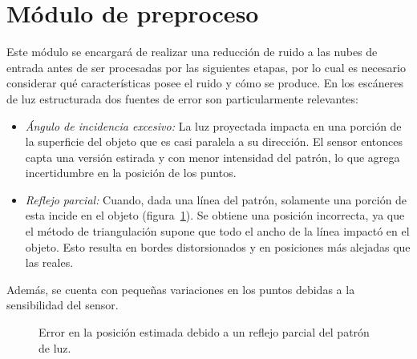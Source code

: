 \section{Módulo de preproceso}
Este módulo se encargará de realizar una reducción de ruido a las nubes de entrada
antes de ser procesadas por las siguientes etapas,
por lo cual es necesario considerar
qué características posee el ruido y cómo se produce.
En los escáneres de luz estructurada dos fuentes de error son particularmente relevantes:
\begin{itemize}
	\item \emph{Ángulo de incidencia excesivo:\/}
		La luz proyectada impacta en una porción de la superficie del objeto
		que es casi paralela a su dirección.
		El sensor entonces capta una versión estirada y con menor intensidad del patrón, lo que 
		agrega incertidumbre en la posición de los puntos.
	\item \emph{Reflejo parcial:\/}
		Cuando, dada una línea del patrón, solamente una porción de esta incide en el objeto (figura~\ref{fig:error_adquisicion}).
		Se obtiene una posición incorrecta, ya que el método de triangulación
		supone que todo el ancho de la línea impactó en el objeto.
		Esto resulta en bordes distorsionados y en posiciones más alejadas que las reales.\cite{Turk:1994:ZPM:192161.192241}
\end{itemize}
Además, se cuenta con pequeñas variaciones en los puntos debidas a la sensibilidad del sensor.

\begin{figure}
	\caption{\label{fig:error_adquisicion}Error en la posición estimada debido a un reflejo parcial del patrón de luz.}
\end{figure}

